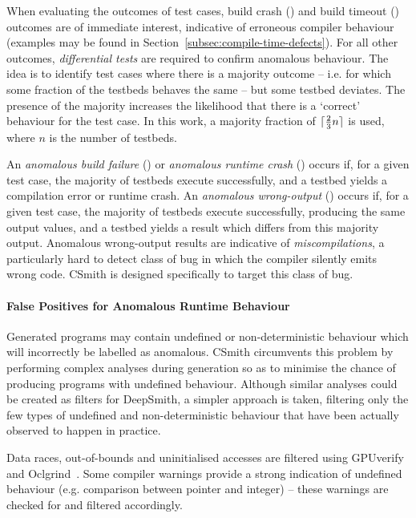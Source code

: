 \newpage
When evaluating the outcomes of test cases, build crash (\bc) and build timeout (\bto) outcomes are of immediate interest, indicative of erroneous compiler behaviour (examples may be found in Section~\ref{subsec:compile-time-defects}). For all other outcomes, \emph{differential tests} are required to confirm anomalous behaviour. The idea is to identify test cases where there is a majority outcome -- i.e. for which some fraction of the testbeds behaves the same -- but some testbed deviates. The presence of the majority increases the likelihood that there is a `correct' behaviour for the test case. In this work, a majority fraction of $\lceil\frac{2}{3}n\rceil$ is used, where $n$ is the number of testbeds.

An \emph{anomalous build failure} (\abf) or \emph{anomalous runtime crash} (\arc) occurs if, for a given test case, the majority of testbeds execute successfully, and a testbed yields a compilation error or runtime crash. An \emph{anomalous wrong-output} (\awo) occurs if, for a given test case, the majority of testbeds execute successfully, producing the same output values, and a testbed yields a result which differs from this majority output. Anomalous wrong-output results are indicative of \emph{miscompilations}, a particularly hard to detect class of bug in which the compiler silently emits wrong code. CSmith is designed specifically to target this class of bug.


\paragraph*{False Positives for Anomalous Runtime Behaviour}

Generated programs may contain undefined or non-deterministic behaviour which will incorrectly be labelled as anomalous. CSmith circumvents this problem by performing complex analyses during generation so as to minimise the chance of producing programs with undefined behaviour. Although similar analyses could be created as filters for DeepSmith, a simpler approach is taken, filtering only the few types of undefined and non-deterministic behaviour that have been actually observed to happen in practice.

Data races, out-of-bounds and uninitialised accesses are filtered using GPUverify~\cite{Betts2012} and Oclgrind~\cite{Price2015}. Some compiler warnings provide a strong indication of undefined behaviour (e.g. comparison between pointer and integer) -- these warnings are checked for and filtered accordingly.

